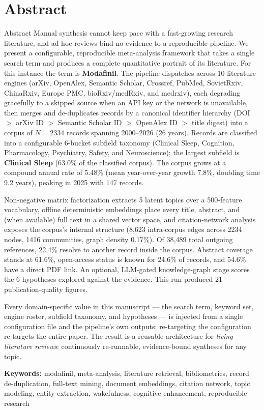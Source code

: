 \documentclass[
  ignorenonframetext,
]{beamer}
\author{\texorpdfstring{}{}}
\date{}
\begin{document}
\section{Abstract}\label{abstract}

\begin{frame}[allowframebreaks]{Abstract}
Manual synthesis cannot keep pace with a fast-growing research
literature, and ad-hoc reviews bind no evidence to a reproducible
pipeline. We present a configurable, reproducible meta-analysis
framework that takes a single search term and produces a complete
quantitative portrait of its literature. For this instance the term is
\textbf{Modafinil}. The pipeline dispatches across 10 literature engines
(arXiv, OpenAlex, Semantic Scholar, Crossref, PubMed, SovietRxiv,
ChinaRxiv, Europe PMC, bioRxiv/medRxiv, and medrxiv), each degrading
gracefully to a skipped source when an API key or the network is
unavailable, then merges and de-duplicates records by a canonical
identifier hierarchy (DOI \(>\) arXiv ID \(>\) Semantic Scholar ID \(>\)
OpenAlex ID \(>\) title digest) into a corpus of \(N = 2334\) records
spanning 2000--2026 (26 years). Records are classified into a
configurable 6-bucket subfield taxonomy (Clinical Sleep, Cognition,
Pharmacology, Psychiatry, Safety, and Neuroscience); the largest
subfield is \textbf{Clinical Sleep} (63.0\% of the classified corpus).
The corpus grows at a compound annual rate of 5.48\% (mean
year-over-year growth 7.8\%, doubling time 9.2 years), peaking in 2025
with 147 records.

Non-negative matrix factorization extracts 5 latent topics over a
500-feature vocabulary, offline deterministic embeddings place every
title, abstract, and (when available) full text in a shared vector
space, and citation-network analysis exposes the corpus's internal
structure (8,623 intra-corpus edges across 2234 nodes, 1416 communities,
graph density 0.17\%). Of 38,489 total outgoing references, 22.4\%
resolve to another record inside the corpus. Abstract coverage stands at
61.6\%, open-access status is known for 24.6\% of records, and 54.6\%
have a direct PDF link. An optional, LLM-gated knowledge-graph stage
scores the 6 hypotheses explored against the evidence. This run produced
21 publication-quality figures.

Every domain-specific value in this manuscript --- the search term,
keyword set, engine roster, subfield taxonomy, and hypotheses --- is
injected from a single configuration file and the pipeline's own
outputs; re-targeting the configuration re-targets the entire paper. The
result is a reusable architecture for \emph{living literature reviews}:
continuously re-runnable, evidence-bound syntheses for any topic.

\textbf{Keywords:} modafinil, meta-analysis, literature retrieval,
bibliometrics, record de-duplication, full-text mining, document
embeddings, citation network, topic modeling, entity extraction,
wakefulness, cognitive enhancement, reproducible research
\end{frame}
\end{document}
